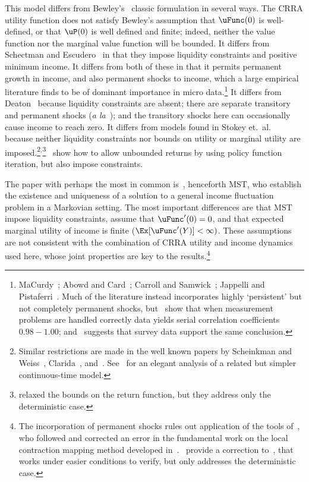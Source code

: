 \documentclass[BufferStockTheory]{subfiles}
\begin{document}
\hypertarget{DiffFromLit}{} This model differs from Bewley's~\citeyearpar{bewleyPIH} classic formulation in several ways. The CRRA utility function does not satisfy Bewley's assumption that $\uFunc(0)$ is well-defined, or that $\uP(0)$ is well defined and finite; indeed, neither the value function nor the marginal value function will be bounded.  It differs from Schectman and Escudero~\citeyearpar{seIncFluct} in that they impose liquidity constraints and positive minimum income.  It differs from both of these in that it permits permanent growth in income, and also permanent shocks to income, which a large empirical literature finds to be of dominant importance in micro data.\footnote{MaCurdy~\citeyearpar{macurdyTimeseries}; Abowd and Card~\citeyearpar{acCovariance}; Carroll and Samwick~\citeyearpar{csNature}; Jappelli and Pistaferri~\citeyearpar{jpCins}.  Much of the literature instead incorporates highly `persistent' but not completely permanent shocks, but~\cite{dhmImproving} show that when measurement problems are handled correctly data yields serial correlation coefficients $0.98-1.00$; and~\cite{dmHowMuch} suggests that survey data support the same conclusion.}  It differs from Deaton~\citeyearpar{deatonLiqConstr} because liquidity constraints are absent; there are separate transitory and permanent shocks (\textit{a la}~\cite{muthOptimal}); and the transitory shocks here can occasionally cause income to reach zero.%
It differs from models found in Stokey et.\ al.~\citeyearpar{slpMethods} because neither liquidity constraints nor bounds on utility or marginal utility are imposed.\footnote{Similar restrictions are made in the well known papers by Scheinkman and Weiss~\citeyearpar{scheinkman&weiss:borrowing}, Clarida~\citeyearpar{claridaErgodic}, and~\cite{cwcUnderUncert}.  See~\cite{tocheUrisk} for an elegant analysis of a related but simpler continuous-time model.}$^{,}$\footnote{\cite{asHomogeneous} relaxed the bounds on the return function, but they address only the deterministic case.}~\cite{lsIncFluct} show how to allow unbounded returns by using policy function iteration, but also impose constraints.

The paper with perhaps the most in common is~\cite{mstIncFluct}, henceforth MST, who establish the existence and uniqueness of a solution to a general income fluctuation problem in a Markovian setting.  The most important differences are that MST impose liquidity constraints, assume that $\uFunc^{\prime}(0)=0$, and that expected marginal utility of income is finite ($\Ex[\uFunc^{\prime}(Y)]<\infty)$.  These assumptions are not consistent with the combination of CRRA utility and income dynamics used here, whose joint properties are key to the results.\footnote{The incorporation of permanent shocks rules out application of the tools of~\cite{mnUnique}, who followed and corrected an error in the fundamental work on the local contraction mapping method developed in~\cite{rrExistence}.\@~\cite{mvExistence} provide a correction to~\cite{rrExistence}, that works under easier conditions to verify, but only addresses the deterministic case.}
\end{document}
